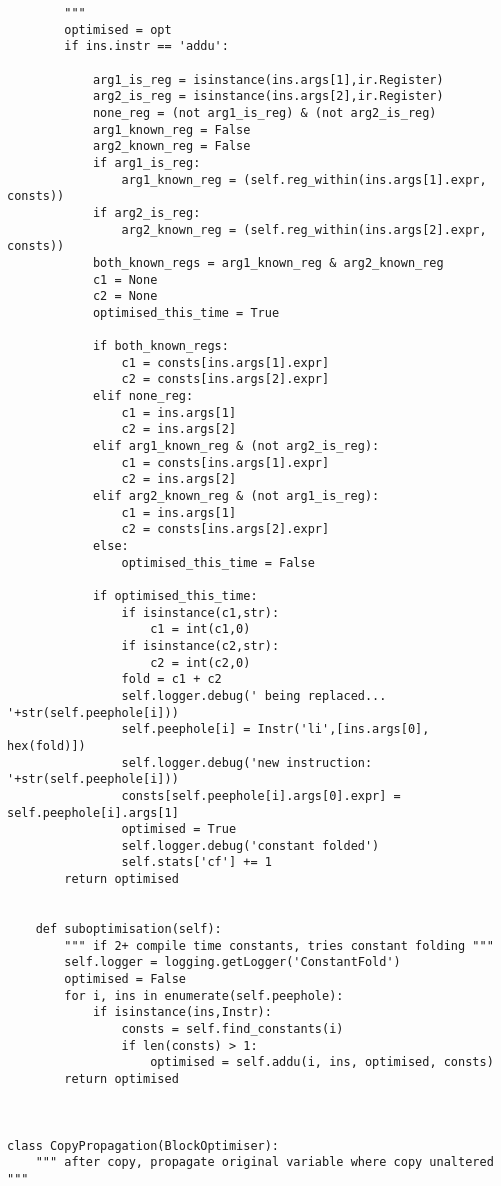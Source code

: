 \begin{lstlisting}
        """    
        optimised = opt
        if ins.instr == 'addu':

            arg1_is_reg = isinstance(ins.args[1],ir.Register)
            arg2_is_reg = isinstance(ins.args[2],ir.Register)
            none_reg = (not arg1_is_reg) & (not arg2_is_reg)
            arg1_known_reg = False
            arg2_known_reg = False
            if arg1_is_reg:
                arg1_known_reg = (self.reg_within(ins.args[1].expr, consts))
            if arg2_is_reg:
                arg2_known_reg = (self.reg_within(ins.args[2].expr, consts))
            both_known_regs = arg1_known_reg & arg2_known_reg
            c1 = None
            c2 = None
            optimised_this_time = True

            if both_known_regs:
                c1 = consts[ins.args[1].expr]
                c2 = consts[ins.args[2].expr]
            elif none_reg:
                c1 = ins.args[1]
                c2 = ins.args[2]
            elif arg1_known_reg & (not arg2_is_reg):
                c1 = consts[ins.args[1].expr]
                c2 = ins.args[2]
            elif arg2_known_reg & (not arg1_is_reg):
                c1 = ins.args[1]
                c2 = consts[ins.args[2].expr]
            else:
                optimised_this_time = False

            if optimised_this_time:
                if isinstance(c1,str):
                    c1 = int(c1,0)
                if isinstance(c2,str):
                    c2 = int(c2,0)
                fold = c1 + c2 
                self.logger.debug(' being replaced... '+str(self.peephole[i]))
                self.peephole[i] = Instr('li',[ins.args[0], hex(fold)])
                self.logger.debug('new instruction: '+str(self.peephole[i]))
                consts[self.peephole[i].args[0].expr] = self.peephole[i].args[1]
                optimised = True
                self.logger.debug('constant folded')
                self.stats['cf'] += 1
        return optimised


    def suboptimisation(self):
        """ if 2+ compile time constants, tries constant folding """
        self.logger = logging.getLogger('ConstantFold')
        optimised = False
        for i, ins in enumerate(self.peephole):
            if isinstance(ins,Instr):
                consts = self.find_constants(i)
                if len(consts) > 1:
                    optimised = self.addu(i, ins, optimised, consts)
        return optimised



class CopyPropagation(BlockOptimiser):
    """ after copy, propagate original variable where copy unaltered """


\end{lstlisting}
